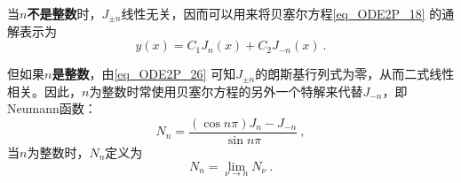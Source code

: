 当$n$\textbf{不是整数}时，$J_{\pm n}$线性无关，因而可以用来将贝塞尔方程\autoref{eq_ODE2P_18} 的通解表示为
\begin{equation}
y(x)=C_1J_n(x)+C_2J_{-n}(x)~.
\end{equation}

但如果$n$\textbf{是整数}，由\autoref{eq_ODE2P_26} 可知$J_{\pm n }$的朗斯基行列式为零，从而二式线性相关。因此，$n$为整数时常使用贝塞尔方程的另外一个特解来代替$J_{-n}$，即Neumann函数：
\begin{equation}
N_n = \frac{(\cos n \pi)J_n - J_{-n}}{\sin n \pi}~,
\end{equation}
当$n$为整数时，$N_n$定义为
\begin{equation}
N_n = \lim_{\nu\to n} N_\nu~.
\end{equation}


















